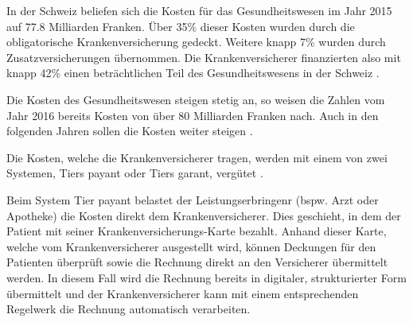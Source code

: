 \documentclass{hwz}
\begin{document}


In der Schweiz beliefen sich die Kosten für das Gesundheitswesen im Jahr 2015 auf 77.8 Milliarden Franken. Über 35\% dieser Kosten wurden durch die obligatorische Krankenversicherung gedeckt. Weitere knapp 7\% wurden durch Zusatzversicherungen übernommen. Die Krankenversicherer finanzierten also mit knapp 42\% einen beträchtlichen Teil des Gesundheitswesens in der Schweiz \autocite{BundesamtfurStatistik2018Finanzierung, BundesamtfurStatistik2017KostenDaten}.

Die Kosten des Gesundheitswesen steigen stetig an, so weisen die Zahlen vom Jahr 2016 bereits Kosten von über 80 Milliarden Franken nach. Auch in den folgenden Jahren sollen die Kosten weiter steigen  \autocite{BundesamtfurStatistik2018Finanzierung}.

Die Kosten, welche die Krankenversicherer tragen, werden mit einem von zwei Systemen, Tiers payant oder Tiers garant, vergütet \autocite{EidgenossischesDepartementdesInnern2017FaktenblattVergutungssysteme}. 

Beim System Tier payant belastet der Leistungserbringenr (bspw. Arzt oder Apotheke) die Kosten direkt dem Krankenversicherer. Dies geschieht, in dem der Patient mit seiner Kranken\-versicherungs-Karte bezahlt. Anhand dieser Karte, welche vom Krankenversicherer ausgestellt wird, können Deckungen für den Patienten überprüft sowie die Rechnung direkt an den Versicherer übermittelt werden. In diesem Fall wird die Rechnung bereits in digitaler, strukturierter Form übermittelt und der Krankenversicherer kann mit einem entsprechenden Regelwerk die Rechnung automatisch verarbeiten. 
\end{document}

